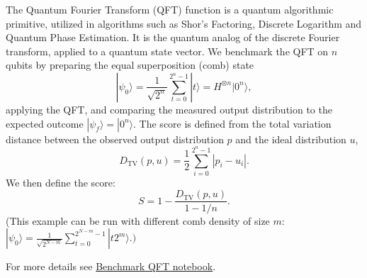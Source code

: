 The Quantum Fourier Transform (QFT) function is a quantum algorithmic primitive, utilized in algorithms such as Shor's Factoring, Discrete Logarithm and Quantum Phase Estimation. It is the quantum analog of the discrete Fourier transform, applied to a quantum state vector.
We benchmark the QFT on \(n\) qubits by preparing the equal superposition (comb) state
\[
|\psi_0\rangle = \frac{1}{\sqrt{2^n}} \sum_{t=0}^{2^n-1} |t\rangle = H^{\otimes n}|0^n\rangle ,
\]
applying the QFT, and comparing the measured output distribution to the expected outcome \(|\psi_f\rangle = |0^n\rangle\).
The score is defined from the total variation distance between the observed output distribution \(p\) and the ideal distribution \(u\),
\[
D_{\mathrm{TV}}(p,u) = \frac{1}{2}\sum_{i=0}^{2^n-1} |p_i - u_i| .
\]
We then define the score:
\[
S = 1 - \frac{D_{\mathrm{TV}}(p,u)}{1 - 1/n} .
\]
(This example can be run with different comb density of size $m$: $|\psi_0 \rangle = \frac{1}{\sqrt{2^{N-m}}}\sum_{t=0}^{2^{N-m}-1}|t 2^m\rangle.)$
\smallskip

For more details see \href{https://github.com/Classiq/classiq-library/tree/main/benchmarking/benchmarks/benchmark\_qft.ipynb}{Benchmark QFT notebook}.
\medskip
